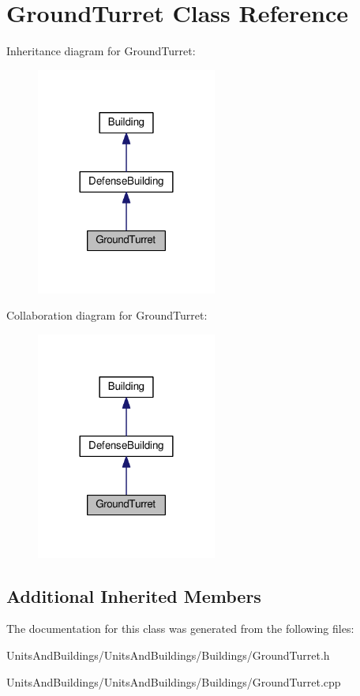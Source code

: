 \hypertarget{class_ground_turret}{}\section{Ground\+Turret Class Reference}
\label{class_ground_turret}


Inheritance diagram for Ground\+Turret\+:
\nopagebreak
\begin{figure}[H]
\begin{center}
\leavevmode
\includegraphics[width=168pt]{class_ground_turret__inherit__graph}
\end{center}
\end{figure}


Collaboration diagram for Ground\+Turret\+:
\nopagebreak
\begin{figure}[H]
\begin{center}
\leavevmode
\includegraphics[width=168pt]{class_ground_turret__coll__graph}
\end{center}
\end{figure}
\subsection*{Additional Inherited Members}


The documentation for this class was generated from the following files\+:\begin{DoxyCompactItemize}
\item 
Units\+And\+Buildings/\+Units\+And\+Buildings/\+Buildings/Ground\+Turret.\+h\item 
Units\+And\+Buildings/\+Units\+And\+Buildings/\+Buildings/Ground\+Turret.\+cpp\end{DoxyCompactItemize}

